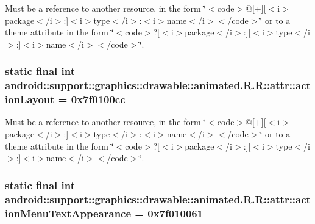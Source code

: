 Must be a reference to another resource, in the form \char`\"{}$<$code$>$@\mbox{[}+\mbox{]}\mbox{[}$<$i$>$package$<$/i$>$:\mbox{]}$<$i$>$type$<$/i$>$:$<$i$>$name$<$/i$>$$<$/code$>$\char`\"{} or to a theme attribute in the form \char`\"{}$<$code$>$?\mbox{[}$<$i$>$package$<$/i$>$:\mbox{]}\mbox{[}$<$i$>$type$<$/i$>$:\mbox{]}$<$i$>$name$<$/i$>$$<$/code$>$\char`\"{}. \hypertarget{classandroid_1_1support_1_1graphics_1_1drawable_1_1animated_1_1_r_1_1attr_e35ec3867fa8adb8e262d33b66b30d8c}{
\subsubsection[{actionLayout}]{\setlength{\rightskip}{0pt plus 5cm}static final int android::support::graphics::drawable::animated.R.R::attr::actionLayout = 0x7f0100cc}}
\label{classandroid_1_1support_1_1graphics_1_1drawable_1_1animated_1_1_r_1_1attr_e35ec3867fa8adb8e262d33b66b30d8c}


Must be a reference to another resource, in the form \char`\"{}$<$code$>$@\mbox{[}+\mbox{]}\mbox{[}$<$i$>$package$<$/i$>$:\mbox{]}$<$i$>$type$<$/i$>$:$<$i$>$name$<$/i$>$$<$/code$>$\char`\"{} or to a theme attribute in the form \char`\"{}$<$code$>$?\mbox{[}$<$i$>$package$<$/i$>$:\mbox{]}\mbox{[}$<$i$>$type$<$/i$>$:\mbox{]}$<$i$>$name$<$/i$>$$<$/code$>$\char`\"{}. \hypertarget{classandroid_1_1support_1_1graphics_1_1drawable_1_1animated_1_1_r_1_1attr_1e7d6405f2b17e192a57b3df30209221}{
\subsubsection[{actionMenuTextAppearance}]{\setlength{\rightskip}{0pt plus 5cm}static final int android::support::graphics::drawable::animated.R.R::attr::actionMenuTextAppearance = 0x7f010061}}
\label{classandroid_1_1support_1_1graphics_1_1drawable_1_1animated_1_1_r_1_1attr_1e7d6405f2b17e192a57b3df30209221}


